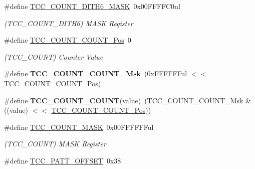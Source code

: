 \begin{DoxyCompactItemize}
\item 
\hypertarget{group___s_a_m_l21___t_c_c_ga98d6639ee7d1ed7304b54b32d1725328}{}\#define \hyperlink{group___s_a_m_l21___t_c_c_ga98d6639ee7d1ed7304b54b32d1725328}{T\+C\+C\+\_\+\+C\+O\+U\+N\+T\+\_\+\+D\+I\+T\+H6\+\_\+\+M\+A\+S\+K}~0x00\+F\+F\+F\+F\+C0ul\label{group___s_a_m_l21___t_c_c_ga98d6639ee7d1ed7304b54b32d1725328}

\begin{DoxyCompactList}\small\item\em (T\+C\+C\+\_\+\+C\+O\+U\+N\+T\+\_\+\+D\+I\+T\+H6) M\+A\+S\+K Register \end{DoxyCompactList}\item 
\hypertarget{group___s_a_m_l21___t_c_c_gafbd308a0411047c1144740ca3e6ca558}{}\#define \hyperlink{group___s_a_m_l21___t_c_c_gafbd308a0411047c1144740ca3e6ca558}{T\+C\+C\+\_\+\+C\+O\+U\+N\+T\+\_\+\+C\+O\+U\+N\+T\+\_\+\+Pos}~0\label{group___s_a_m_l21___t_c_c_gafbd308a0411047c1144740ca3e6ca558}

\begin{DoxyCompactList}\small\item\em (T\+C\+C\+\_\+\+C\+O\+U\+N\+T) Counter Value \end{DoxyCompactList}\item 
\hypertarget{group___s_a_m_l21___t_c_c_gaf07e8528fbf5f34cd232565a2e62d7df}{}\#define {\bfseries T\+C\+C\+\_\+\+C\+O\+U\+N\+T\+\_\+\+C\+O\+U\+N\+T\+\_\+\+Msk}~(0x\+F\+F\+F\+F\+F\+Ful $<$$<$ T\+C\+C\+\_\+\+C\+O\+U\+N\+T\+\_\+\+C\+O\+U\+N\+T\+\_\+\+Pos)\label{group___s_a_m_l21___t_c_c_gaf07e8528fbf5f34cd232565a2e62d7df}

\item 
\hypertarget{group___s_a_m_l21___t_c_c_gaa936258288716306ffb1343a23caa88f}{}\#define {\bfseries T\+C\+C\+\_\+\+C\+O\+U\+N\+T\+\_\+\+C\+O\+U\+N\+T}(value)~(T\+C\+C\+\_\+\+C\+O\+U\+N\+T\+\_\+\+C\+O\+U\+N\+T\+\_\+\+Msk \& ((value) $<$$<$ \hyperlink{group___s_a_m_l21___t_c_c_gafbd308a0411047c1144740ca3e6ca558}{T\+C\+C\+\_\+\+C\+O\+U\+N\+T\+\_\+\+C\+O\+U\+N\+T\+\_\+\+Pos}))\label{group___s_a_m_l21___t_c_c_gaa936258288716306ffb1343a23caa88f}

\item 
\hypertarget{group___s_a_m_l21___t_c_c_gadac2a1500ae9b52dca0fce4386f6de04}{}\#define \hyperlink{group___s_a_m_l21___t_c_c_gadac2a1500ae9b52dca0fce4386f6de04}{T\+C\+C\+\_\+\+C\+O\+U\+N\+T\+\_\+\+M\+A\+S\+K}~0x00\+F\+F\+F\+F\+F\+Ful\label{group___s_a_m_l21___t_c_c_gadac2a1500ae9b52dca0fce4386f6de04}

\begin{DoxyCompactList}\small\item\em (T\+C\+C\+\_\+\+C\+O\+U\+N\+T) M\+A\+S\+K Register \end{DoxyCompactList}\item 
\hypertarget{group___s_a_m_l21___t_c_c_ga5397a883eb528120348f092d392483d3}{}\#define \hyperlink{group___s_a_m_l21___t_c_c_ga5397a883eb528120348f092d392483d3}{T\+C\+C\+\_\+\+P\+A\+T\+T\+\_\+\+O\+F\+F\+S\+E\+T}~0x38\label{group___s_a_m_l21___t_c_c_ga5397a883eb528120348f092d392483d3}


\end{DoxyCompactItemize}
